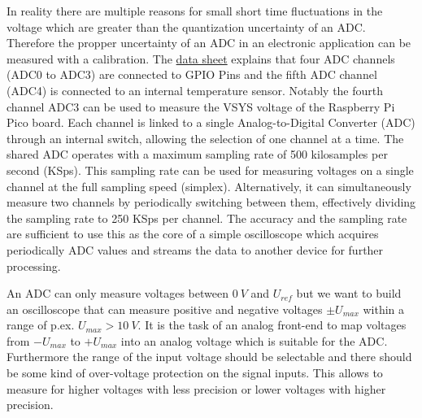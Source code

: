 In reality there are multiple reasons for small short time fluctuations in the voltage which are greater than the quantization uncertainty of an ADC. Therefore the propper uncertainty of an ADC in an electronic application can be measured with a calibration.
The \href{https://datasheets.raspberrypi.com/rp2040/rp2040-datasheet.pdf}{data sheet} explains that four ADC channels (ADC0 to ADC3) are connected to GPIO Pins and the fifth ADC channel (ADC4) is connected to an internal temperature sensor. Notably the fourth channel ADC3 can be used to measure the VSYS voltage of the Raspberry Pi Pico board.
Each channel is linked to a single Analog-to-Digital Converter (ADC) through an internal switch, allowing the selection of one channel at a time. The shared ADC operates with a maximum sampling rate of 500 kilosamples per second (KSps). This sampling rate can be used for measuring voltages on a single channel at the full sampling speed (simplex). Alternatively, it can simultaneously measure two channels by periodically switching between them, effectively dividing the sampling rate to 250 KSps per channel. The accuracy and the sampling rate are sufficient to use this as the core of a simple oscilloscope which acquires periodically ADC values and streams the data to another device for further processing.

An ADC can only measure voltages between $\SI{0}{V}$ and $U_{ref}$ but we want to build an oscilloscope that can measure positive and negative voltages $\pm{}U_{max}$ within a range of p.ex. $U_{max} > \SI{10}{V}$. It is the task of an analog front-end to map voltages from $-U_{max}$ to $+U_{max}$ into an analog voltage which is suitable for the ADC. Furthermore the range of the input voltage should be selectable and there should be some kind of over-voltage protection on the signal inputs. This allows to measure for higher voltages with less precision or lower voltages with higher precision.

